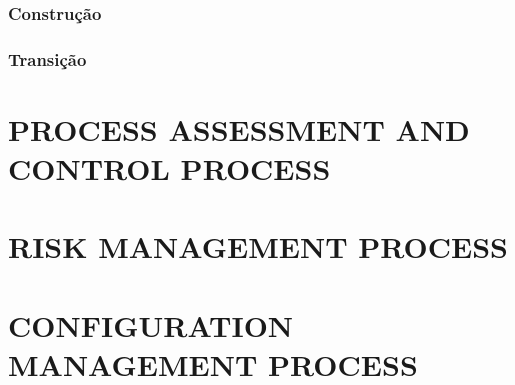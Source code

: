\documentclass[11pt, twoside, a4paper]{book}
\begin{document}
        			\subsection{Construção}
        			
        			\subsection{Transição}

        \chapter{PROCESS ASSESSMENT AND CONTROL PROCESS}
                    
        \chapter{RISK MANAGEMENT PROCESS}
        
        \chapter{CONFIGURATION MANAGEMENT PROCESS}
    
    
\end{document}
